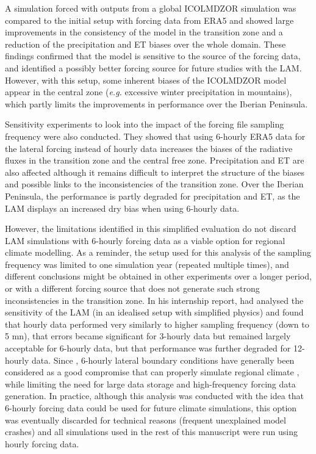 A simulation forced with outputs from a global ICOLMDZOR simulation was compared to the initial setup with forcing data from ERA5 and showed large improvements in the consistency of the model in the transition zone and a reduction of the precipitation and ET biases over the whole domain.
These findings confirmed that the model is sensitive to the source of the forcing data, and identified a possibly better forcing source for future studies with the LAM. However, with this setup, some inherent biases of the ICOLMDZOR model appear in the central zone (\textit{e.g.} excessive winter precipitation in mountains), which partly limits the improvements in performance over the Iberian Peninsula. 

Sensitivity experiments to look into the impact of the forcing file sampling frequency were also conducted. They showed that using 6-hourly ERA5 data for the lateral forcing instead of hourly data increases the biases of the radiative fluxes in the transition zone and the central free zone. Precipitation and ET are also affected although it remains difficult to interpret the structure of the biases and possible links to the inconsistencies of the transition zone.
Over the Iberian Peninsula, the performance is partly degraded for precipitation and ET, as the LAM displays an increased dry bias when using 6-hourly data. 

However, the limitations identified in this simplified evaluation do not discard LAM simulations with 6-hourly forcing data as a viable option for regional climate modelling.
As a reminder, the setup used for this analysis of the sampling frequency was limited to one simulation year (repeated multiple times), and different conclusions might be obtained in other experiments over a longer period, or with a different forcing source that does not generate such strong inconsistencies in the transition zone.
In his internship report, \citet{conesa2022} had analysed the sensitivity of the LAM (in an idealised setup with simplified physics) and found that hourly data performed very similarly to higher sampling frequency (down to 5 mn), that errors became significant for 3-hourly data but remained largely acceptable for 6-hourly data, but that performance was further degraded for 12-hourly data.
Since \citet{denis_sensitivity_2003}, 6-hourly lateral boundary conditions have generally been considered as a good compromise that can properly simulate regional climate \citep[enabling similar performance to 3-hourly data,][]{dimitrijevic_validation_2005}, while limiting the need for large data storage and high-frequency forcing data generation.
In practice, although this analysis was conducted with the idea that 6-hourly forcing data could be used for future climate simulations, this option was eventually discarded for technical reasons (frequent unexplained model crashes) and all simulations used in the rest of this manuscript were run using hourly forcing data.

